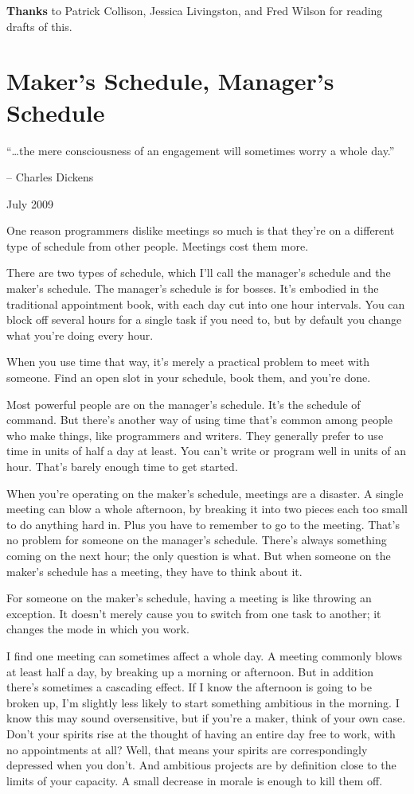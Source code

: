 \documentclass[12pt]{book}
\begin{document}
\textbf{Thanks} to Patrick Collison, Jessica Livingston, and Fred Wilson
for reading drafts of this.
\chapter{Maker's Schedule, Manager's Schedule }

``\ldots the mere consciousness of an engagement will sometimes worry a
whole day.''

-- Charles Dickens

July 2009

One reason programmers dislike meetings so much is that they're on a
different type of schedule from other people. Meetings cost them more.

There are two types of schedule, which I'll call the manager's schedule
and the maker's schedule. The manager's schedule is for bosses. It's
embodied in the traditional appointment book, with each day cut into one
hour intervals. You can block off several hours for a single task if you
need to, but by default you change what you're doing every hour.

When you use time that way, it's merely a practical problem to meet with
someone. Find an open slot in your schedule, book them, and you're done.

Most powerful people are on the manager's schedule. It's the schedule of
command. But there's another way of using time that's common among
people who make things, like programmers and writers. They generally
prefer to use time in units of half a day at least. You can't write or
program well in units of an hour. That's barely enough time to get
started.

When you're operating on the maker's schedule, meetings are a disaster.
A single meeting can blow a whole afternoon, by breaking it into two
pieces each too small to do anything hard in. Plus you have to remember
to go to the meeting. That's no problem for someone on the manager's
schedule. There's always something coming on the next hour; the only
question is what. But when someone on the maker's schedule has a
meeting, they have to think about it.

For someone on the maker's schedule, having a meeting is like throwing
an exception. It doesn't merely cause you to switch from one task to
another; it changes the mode in which you work.

I find one meeting can sometimes affect a whole day. A meeting commonly
blows at least half a day, by breaking up a morning or afternoon. But in
addition there's sometimes a cascading effect. If I know the afternoon
is going to be broken up, I'm slightly less likely to start something
ambitious in the morning. I know this may sound oversensitive, but if
you're a maker, think of your own case. Don't your spirits rise at the
thought of having an entire day free to work, with no appointments at
all? Well, that means your spirits are correspondingly depressed when
you don't. And ambitious projects are by definition close to the limits
of your capacity. A small decrease in morale is enough to kill them off.
\end{document}
